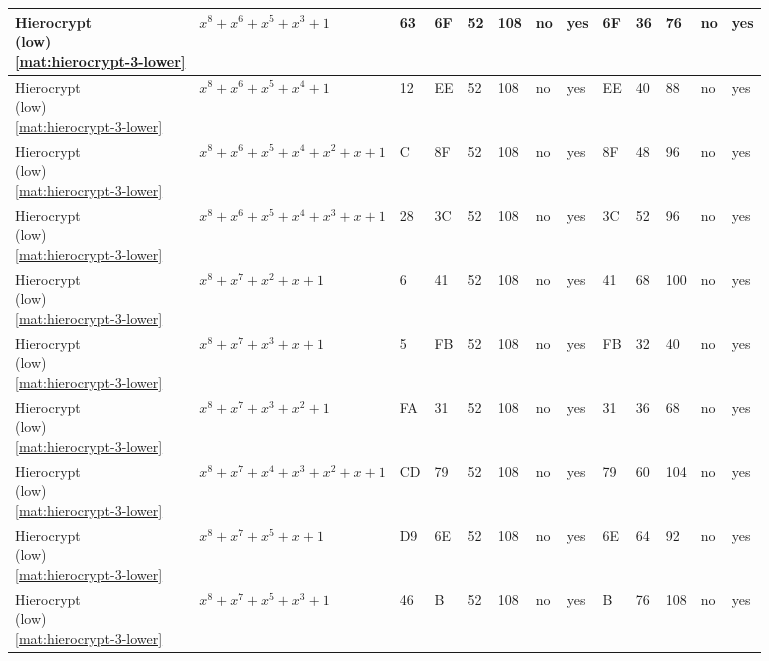 \begin{tiny}
\begin{longtable}{|l|l|l|l|l|l|l|l|l|l|l|l|l|}
\shortstack{Hierocrypt \\ (low) \\ \eqref{mat:hierocrypt-3-lower}} & $x^8 + x^6 + x^5 + x^3 + 1$ & 63 & 6F & 52 & 108 & no & yes & 6F & 36 & 76 & no & yes \\ \hline
\shortstack{Hierocrypt \\ (low) \\ \eqref{mat:hierocrypt-3-lower}} & $x^8 + x^6 + x^5 + x^4 + 1$ & 12 & EE & 52 & 108 & no & yes & EE & 40 & 88 & no & yes \\ \hline
\shortstack{Hierocrypt \\ (low) \\ \eqref{mat:hierocrypt-3-lower}} & $x^8 + x^6 + x^5 + x^4 + x^2 + x + 1$ & C & 8F & 52 & 108 & no & yes & 8F & 48 & 96 & no & yes \\ \hline
\shortstack{Hierocrypt \\ (low) \\ \eqref{mat:hierocrypt-3-lower}} & $x^8 + x^6 + x^5 + x^4 + x^3 + x + 1$ & 28 & 3C & 52 & 108 & no & yes & 3C & 52 & 96 & no & yes \\ \hline
\shortstack{Hierocrypt \\ (low) \\ \eqref{mat:hierocrypt-3-lower}} & $x^8 + x^7 + x^2 + x + 1$ & 6 & 41 & 52 & 108 & no & yes & 41 & 68 & 100 & no & yes \\ \hline
\shortstack{Hierocrypt \\ (low) \\ \eqref{mat:hierocrypt-3-lower}} & $x^8 + x^7 + x^3 + x + 1$ & 5 & FB & 52 & 108 & no & yes & FB & 32 & 40 & no & yes \\ \hline
\shortstack{Hierocrypt \\ (low) \\ \eqref{mat:hierocrypt-3-lower}} & $x^8 + x^7 + x^3 + x^2 + 1$ & FA & 31 & 52 & 108 & no & yes & 31 & 36 & 68 & no & yes \\ \hline
\shortstack{Hierocrypt \\ (low) \\ \eqref{mat:hierocrypt-3-lower}} & $x^8 + x^7 + x^4 + x^3 + x^2 + x + 1$ & CD & 79 & 52 & 108 & no & yes & 79 & 60 & 104 & no & yes \\ \hline
\shortstack{Hierocrypt \\ (low) \\ \eqref{mat:hierocrypt-3-lower}} & $x^8 + x^7 + x^5 + x + 1$ & D9 & 6E & 52 & 108 & no & yes & 6E & 64 & 92 & no & yes \\ \hline
\shortstack{Hierocrypt \\ (low) \\ \eqref{mat:hierocrypt-3-lower}} & $x^8 + x^7 + x^5 + x^3 + 1$ & 46 & B & 52 & 108 & no & yes & B & 76 & 108 & no & yes \\ \hline

\end{longtable}
\end{tiny}
